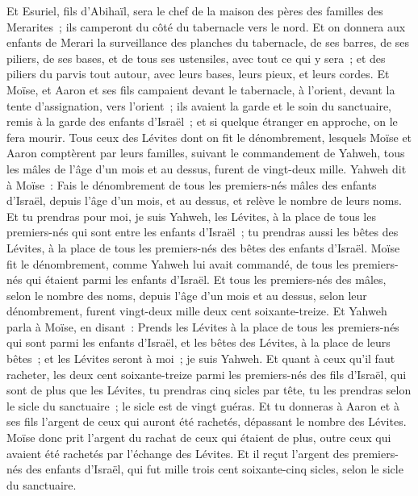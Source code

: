 \begin{multicols}{2}
Et Esuriel, fils d'Abihaïl, sera le chef de la maison des pères des familles des Merarites~; ils camperont du côté du tabernacle vers le nord.
Et on donnera aux enfants de Merari la surveillance des planches du tabernacle, de ses barres, de ses piliers, de ses bases, et de tous ses ustensiles, avec tout ce qui y sera~;
et des piliers du parvis tout autour, avec leurs bases, leurs pieux, et leurs cordes.
Et Moïse, et Aaron et ses fils campaient devant le tabernacle, à l'orient, devant la tente d'assignation, vers l'orient~; ils avaient la garde et le soin du sanctuaire, remis à la garde des enfants d'Israël~; et si quelque étranger en approche, on le fera mourir.
Tous ceux des Lévites dont on fit le dénombrement, lesquels Moïse et Aaron comptèrent par leurs familles, suivant le commandement de Yahweh, tous les mâles de l'âge d'un mois et au dessus, furent de vingt-deux mille.
Yahweh dit à Moïse~: Fais le dénombrement de tous les premiers-nés mâles des enfants d'Israël, depuis l'âge d'un mois, et au dessus, et relève le nombre de leurs noms.
Et tu prendras pour moi, je suis Yahweh, les Lévites, à la place de tous les premiers-nés qui sont entre les enfants d'Israël~; tu prendras aussi les bêtes des Lévites, à la place de tous les premiers-nés des bêtes des enfants d'Israël.
Moïse fit le dénombrement, comme Yahweh lui avait commandé, de tous les premiers-nés qui étaient parmi les enfants d'Israël.
Et tous les premiers-nés des mâles, selon le nombre des noms, depuis l'âge d'un mois et au dessus, selon leur dénombrement, furent vingt-deux mille deux cent soixante-treize.
Et Yahweh parla à Moïse, en disant~:
Prends les Lévites à la place de tous les premiers-nés qui sont parmi les enfants d'Israël, et les bêtes des Lévites, à la place de leurs bêtes~; et les Lévites seront à moi~; je suis Yahweh.
Et quant à ceux qu'il faut racheter, les deux cent soixante-treize parmi les premiers-nés des fils d'Israël, qui sont de plus que les Lévites,
tu prendras cinq sicles par tête, tu les prendras selon le sicle du sanctuaire~; le sicle est de vingt guéras.
Et tu donneras à Aaron et à ses fils l'argent de ceux qui auront été rachetés, dépassant le nombre des Lévites.
Moïse donc prit l'argent du rachat de ceux qui étaient de plus, outre ceux qui avaient été rachetés par l'échange des Lévites.
Et il reçut l'argent des premiers-nés des enfants d'Israël, qui fut mille trois cent soixante-cinq sicles, selon le sicle du sanctuaire.

\end{multicols}
